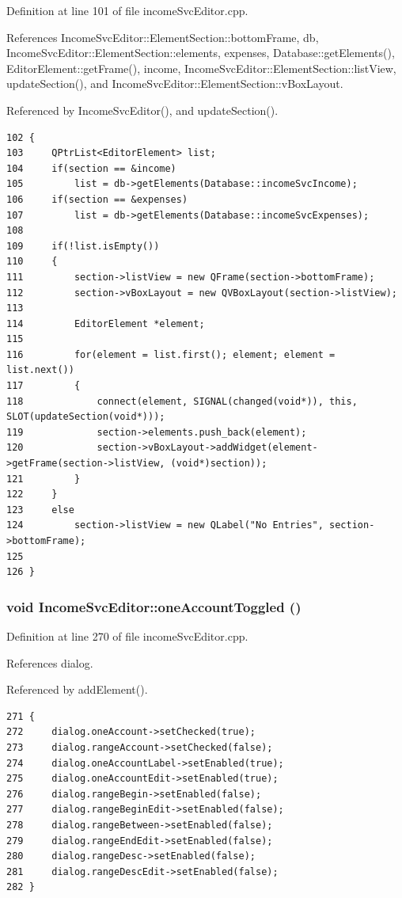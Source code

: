 Definition at line 101 of file income\-Svc\-Editor.cpp.

References Income\-Svc\-Editor::Element\-Section::bottom\-Frame, db, Income\-Svc\-Editor::Element\-Section::elements, expenses, Database::get\-Elements(), Editor\-Element::get\-Frame(), income, Income\-Svc\-Editor::Element\-Section::list\-View, update\-Section(), and Income\-Svc\-Editor::Element\-Section::v\-Box\-Layout.

Referenced by Income\-Svc\-Editor(), and update\-Section().

\footnotesize\begin{verbatim}102 {
103     QPtrList<EditorElement> list;
104     if(section == &income)
105         list = db->getElements(Database::incomeSvcIncome);
106     if(section == &expenses)
107         list = db->getElements(Database::incomeSvcExpenses);
108     
109     if(!list.isEmpty())
110     {
111         section->listView = new QFrame(section->bottomFrame);
112         section->vBoxLayout = new QVBoxLayout(section->listView);
113         
114         EditorElement *element;
115         
116         for(element = list.first(); element; element = list.next())
117         {
118             connect(element, SIGNAL(changed(void*)), this, SLOT(updateSection(void*)));
119             section->elements.push_back(element);
120             section->vBoxLayout->addWidget(element->getFrame(section->listView, (void*)section));
121         }
122     }
123     else
124         section->listView = new QLabel("No Entries", section->bottomFrame);
125     
126 }
\end{verbatim}\normalsize 


\hypertarget{classIncomeSvcEditor_k4}{
\subsubsection[oneAccountToggled]{\setlength{\rightskip}{0pt plus 5cm}void Income\-Svc\-Editor::one\-Account\-Toggled ()}}
\label{classIncomeSvcEditor_k4}


Definition at line 270 of file income\-Svc\-Editor.cpp.

References dialog.

Referenced by add\-Element().

\footnotesize\begin{verbatim}271 {
272     dialog.oneAccount->setChecked(true);
273     dialog.rangeAccount->setChecked(false);
274     dialog.oneAccountLabel->setEnabled(true);
275     dialog.oneAccountEdit->setEnabled(true);
276     dialog.rangeBegin->setEnabled(false);
277     dialog.rangeBeginEdit->setEnabled(false);
278     dialog.rangeBetween->setEnabled(false);
279     dialog.rangeEndEdit->setEnabled(false);
280     dialog.rangeDesc->setEnabled(false);
281     dialog.rangeDescEdit->setEnabled(false);
282 }
\end{verbatim}\normalsize 



